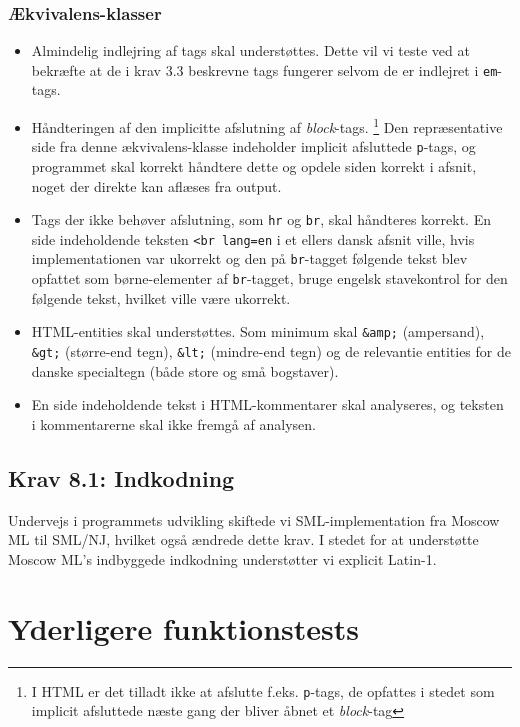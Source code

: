 \documentclass[a4paper,oneside,article]{memoir}
\begin{document}
\begin{landscape}
\subsection{Ækvivalens-klasser}
\begin{itemize}
\item Almindelig indlejring af tags skal understøttes. Dette vil vi
  teste ved at bekræfte at de i krav 3.3 beskrevne tags fungerer
  selvom de er indlejret i \texttt{em}-tags.
\item Håndteringen af den implicitte afslutning af
  \textit{block}-tags. \footnote{I HTML er det tilladt ikke at
    afslutte f.eks. \texttt{p}-tags, de opfattes i stedet som implicit
    afsluttede næste gang der bliver åbnet et \textit{block}-tag} Den
  repræsentative side fra denne ækvivalens-klasse indeholder implicit
  afsluttede \texttt{p}-tags, og programmet skal korrekt håndtere
  dette og opdele siden korrekt i afsnit, noget der direkte kan
  aflæses fra output.
\item Tags der ikke behøver afslutning, som \texttt{hr} og
  \texttt{br}, skal håndteres korrekt. En side indeholdende teksten
  \texttt{<br lang=en} i et ellers dansk afsnit ville, hvis
  implementationen var ukorrekt og den på \texttt{br}-tagget følgende
  tekst blev opfattet som børne-elementer af \texttt{br}-tagget, bruge
  engelsk stavekontrol for den følgende tekst, hvilket ville være
  ukorrekt.
\item HTML-entities skal understøttes. Som minimum skal \texttt{\&amp;}
  (ampersand), \texttt{\&gt;} (større-end tegn), \texttt{\&lt;}
  (mindre-end tegn) og de relevantie entities for de danske
  specialtegn (både store og små bogstaver).
\item En side indeholdende tekst i HTML-kommentarer skal analyseres,
  og teksten i kommentarerne skal ikke fremgå af analysen.
\end{itemize}

\section{Krav 8.1: Indkodning}

Undervejs i programmets udvikling skiftede vi SML-implementation fra
Moscow ML til SML/NJ, hvilket også ændrede dette krav. I stedet for at
understøtte Moscow ML's indbyggede indkodning understøtter vi explicit
Latin-1.

\end{landscape}

\chapter{Yderligere funktionstests}
\end{document}
